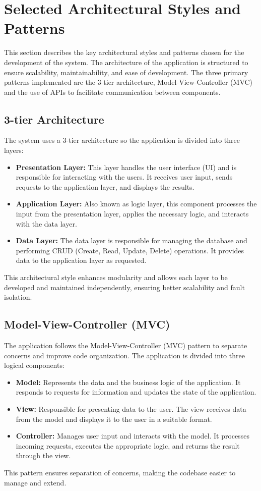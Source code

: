 \section{Selected Architectural Styles and Patterns}
\label{sec:selected_Srchitectural_styles_patterns}%
This section describes the key architectural styles and patterns chosen for the development of the system. The architecture of the application is structured to ensure scalability, maintainability, and ease of development. The three primary patterns implemented are the 3-tier architecture, Model-View-Controller (MVC) and the use of APIs to facilitate communication between components.

\subsection{3-tier Architecture}
The system uses a 3-tier architecture so the application is divided into three layers:
\begin{itemize}
    \item \textbf{Presentation Layer:} This layer handles the user interface (UI) and is responsible for interacting with the users. It receives user input, sends requests to the application layer, and displays the results.
    \item \textbf{Application Layer:} Also known as logic layer, this component processes the input from the presentation layer, applies the necessary logic, and interacts with the data layer.
    \item \textbf{Data Layer:} The data layer is responsible for managing the database and performing CRUD (Create, Read, Update, Delete) operations. It provides data to the application layer as requested.
\end{itemize}
This architectural style enhances modularity and allows each layer to be developed and maintained independently, ensuring better scalability and fault isolation.

\subsection{Model-View-Controller (MVC)}
The application follows the Model-View-Controller (MVC) pattern to separate concerns and improve code organization. The application is divided into three logical components:
\begin{itemize}
    \item \textbf{Model:} Represents the data and the business logic of the application. It responds to requests for information and updates the state of the application.
    \item \textbf{View:} Responsible for presenting data to the user. The view receives data from the model and displays it to the user in a suitable format.
    \item \textbf{Controller:} Manages user input and interacts with the model. It processes incoming requests, executes the appropriate logic, and returns the result through the view.
\end{itemize}
This pattern ensures separation of concerns, making the codebase easier to manage and extend.

